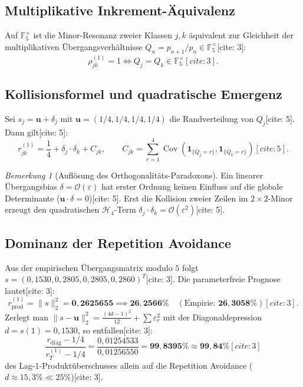 \documentclass[11pt,a4paper]{article}
\theoremstyle{definition}
\theoremstyle{remark}
\newtheorem{bemerkung}[theorem]{Bemerkung}
\begin{document}
\subsection{Multiplikative Inkrement-Äquivalenz}
Auf $\mathbb{F}_5^\times$ ist die Minor-Resonanz zweier Klassen $j, k$ äquivalent zur Gleichheit der multiplikativen Übergangsverhältnisse $Q_n = p_{n+1}/p_n \in \mathbb{F}_5^\times$[cite: 3]:
\begin{equation}
\rho_{jk}^{(1)} = 1 \iff Q_j = Q_k \in \mathbb{F}_5^\times[cite: 3].
\end{equation}

\subsection{Kollisionsformel und quadratische Emergenz}
Sei $s_j = \mathbf{u} + \delta_j$ mit $\mathbf{u} = (1/4, 1/4, 1/4, 1/4)$ die Randverteilung von $Q_j$[cite: 5]. Dann gilt[cite: 5]:
\begin{equation}
r_{jk}^{(1)} = \frac{1}{4} + \delta_j \cdot \delta_k + C_{jk}, \qquad C_{jk} = \sum_{r=1}^4 \operatorname{Cov}\left(\mathbf{1}_{\{Q_j=r\}}, \mathbf{1}_{\{Q_k=r\}}\right)[cite: 5].
\end{equation}
\begin{bemerkung}[Auflösung des Orthogonalitäts-Paradoxons]
Ein linearer Übergangsbias $\delta = \mathcal{O}(\varepsilon)$ hat erster Ordnung keinen Einfluss auf die globale Determinante ($\mathbf{u} \cdot \delta = 0$)[cite: 5]. Erst die Kollision zweier Zeilen im $2\times 2$-Minor erzeugt den quadratischen $\mathcal{H}_4$-Term $\delta_j \cdot \delta_k = \mathcal{O}(\varepsilon^2)$[cite: 5].
\end{bemerkung}

\subsection{Dominanz der Repetition Avoidance}
Aus der empirischen Übergangsmatrix modulo $5$ folgt $s = (0{,}1530, 0{,}2805, 0{,}2805, 0{,}2860)^T$[cite: 3]. Die parameterfreie Prognose lautet[cite: 3]:
\begin{equation}
r_{\mathrm{prod}}^{(1)} = \|s\|_2^2 = \mathbf{0{,}2625655} \implies \mathbf{26{,}2566\%} \quad (\text{Empirie: } \mathbf{26{,}3058\%})[cite: 3].
\end{equation}
Zerlegt man $\|s-\mathbf{u}\|_2^2 = \frac{(4d-1)^2}{12} + \sum \varepsilon_r^2$ mit der Diagonaldepression $d = s(1) = 0{,}1530$, so entfallen[cite: 3]:
\begin{equation}
\frac{r_{\mathrm{diag}} - 1/4}{r_T^{(1)} - 1/4} = \frac{0{,}01254533}{0{,}01256550} = \mathbf{99{,}8395\% \approx 99{,}84\%}[cite: 3]
\end{equation}
des Lag-1-Produktüberschusses allein auf die Repetition Avoidance ($d \approx 15{,}3\% \ll 25\%$)[cite: 3].
\end{document}
